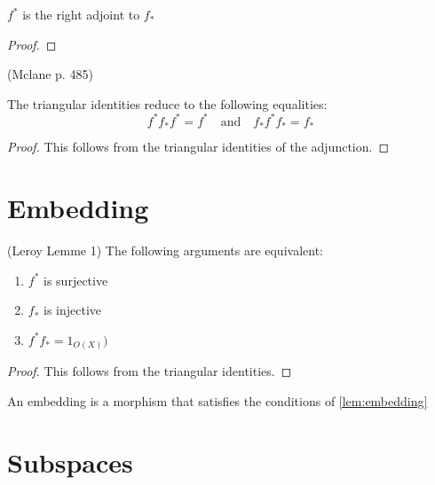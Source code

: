 \begin{lemma}[$f^* \dashv f_*$]
    \label{lem:f_star_adj}
    \leanok
    $f^*$ is the right adjoint to $f_*$
\end{lemma}
\begin{proof}
    \leanok
\end{proof}

\begin{lemma}[triangle]
(Mclane p. 485)

    The triangular identities reduce to the following equalities:
    \[f^*f_*f^* = f^* \quad \text{and} \quad f_*f^*f_* = f_*\]
    \leanok
    \label{lem:triangle}
\end{lemma}
\begin{proof}

    This follows from the triangular identities of the adjunction.
    \leanok
\end{proof}


\section{Embedding}

\begin{lemma}[Embedding]
(Leroy Lemme 1)
    \label{lem:embedding}
    The following arguments are equivalent:
    \begin{enumerate}
        \item $f^*$ is surjective
        \item $f_*$ is injective
        \item $f^{*}f_* = 1_{O(X)})$
    \end{enumerate}
\end{lemma}
\begin{proof}
    This follows from the triangular identities. \leanok
\end{proof}

\begin{definition}[Embedding]
    \label{def:embedding}
    An embedding is a morphism that satisfies the conditions of \cref{lem:embedding}
    \leanok
\end{definition}


\section{Subspaces}


